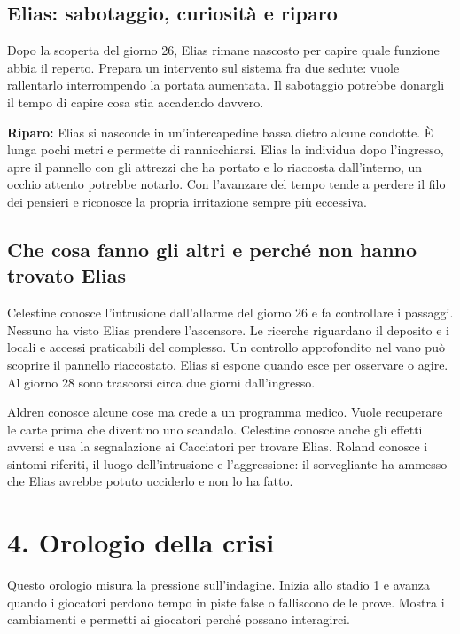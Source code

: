 \documentclass[11pt,a4paper]{article}
\begin{document}
\subsection{Elias: sabotaggio, curiosità e riparo}
Dopo la scoperta del giorno 26, Elias rimane nascosto per capire quale funzione abbia il reperto. Prepara un intervento sul sistema fra due sedute: vuole rallentarlo interrompendo la portata aumentata. Il sabotaggio potrebbe donargli il tempo di capire cosa stia accadendo davvero.

\textbf{Riparo:} Elias si nasconde in un'intercapedine bassa dietro alcune condotte. È lunga pochi metri e permette di rannicchiarsi. Elias la individua dopo l'ingresso, apre il pannello con gli attrezzi che ha portato e lo riaccosta dall'interno, un occhio attento potrebbe notarlo. Con l'avanzare del tempo tende a perdere il filo dei pensieri e riconosce la propria irritazione sempre più eccessiva.

\subsection{Che cosa fanno gli altri e perché non hanno trovato Elias}
Celestine conosce l'intrusione dall'allarme del giorno 26 e fa controllare i passaggi. Nessuno ha visto Elias prendere l'ascensore. Le ricerche riguardano il deposito e i locali e accessi praticabili del complesso. Un controllo approfondito nel vano può scoprire il pannello riaccostato. Elias si espone quando esce per osservare o agire. Al giorno 28 sono trascorsi circa due giorni dall'ingresso.

Aldren conosce alcune cose ma crede a un programma medico. Vuole recuperare le carte prima che diventino uno scandalo. Celestine conosce anche gli effetti avversi e usa la segnalazione ai Cacciatori per trovare Elias. Roland conosce i sintomi riferiti, il luogo dell'intrusione e l'aggressione: il sorvegliante ha ammesso che Elias avrebbe potuto ucciderlo e non lo ha fatto.

\section{4. Orologio della crisi}

Questo orologio misura la pressione sull'indagine. Inizia allo stadio 1 e avanza quando i giocatori perdono tempo in piste false o falliscono delle prove. Mostra i cambiamenti e permetti ai giocatori perché possano interagirci.
\end{document}
